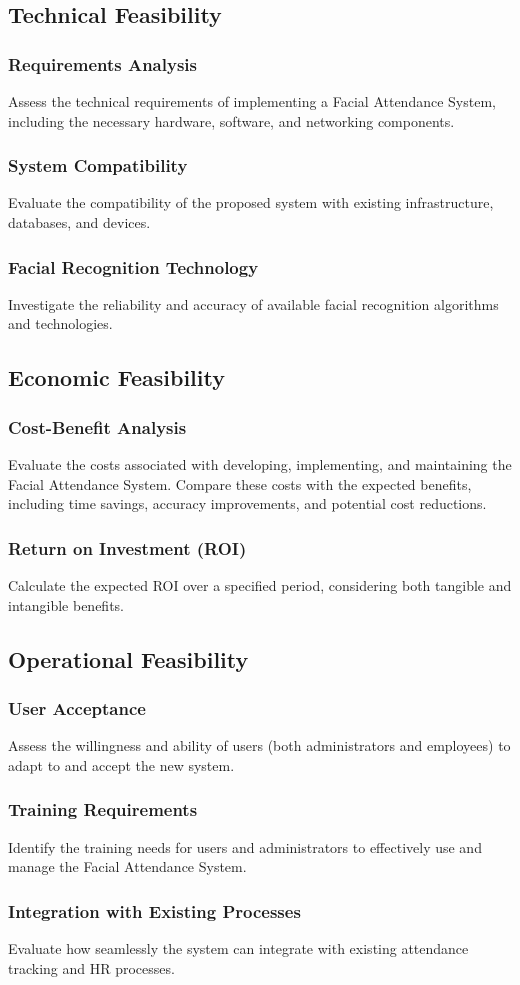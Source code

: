 \subsection{Technical Feasibility}

\subsubsection{Requirements Analysis} Assess the technical requirements of implementing a Facial Attendance System, including the necessary hardware, software, and networking components.
\subsubsection{System Compatibility} Evaluate the compatibility of the proposed system with existing infrastructure, databases, and devices.
\subsubsection{Facial Recognition Technology} Investigate the reliability and accuracy of available facial recognition algorithms and technologies.
\subsection{Economic Feasibility}

\subsubsection{Cost-Benefit Analysis} Evaluate the costs associated with developing, implementing, and maintaining the Facial Attendance System. Compare these costs with the expected benefits, including time savings, accuracy improvements, and potential cost reductions.
\subsubsection{Return on Investment (ROI)} Calculate the expected ROI over a specified period, considering both tangible and intangible benefits.
\subsection{Operational Feasibility}

\subsubsection{User Acceptance} Assess the willingness and ability of users (both administrators and employees) to adapt to and accept the new system.
\subsubsection{Training Requirements} Identify the training needs for users and administrators to effectively use and manage the Facial Attendance System.
\subsubsection{Integration with Existing Processes} Evaluate how seamlessly the system can integrate with existing attendance tracking and HR processes.
